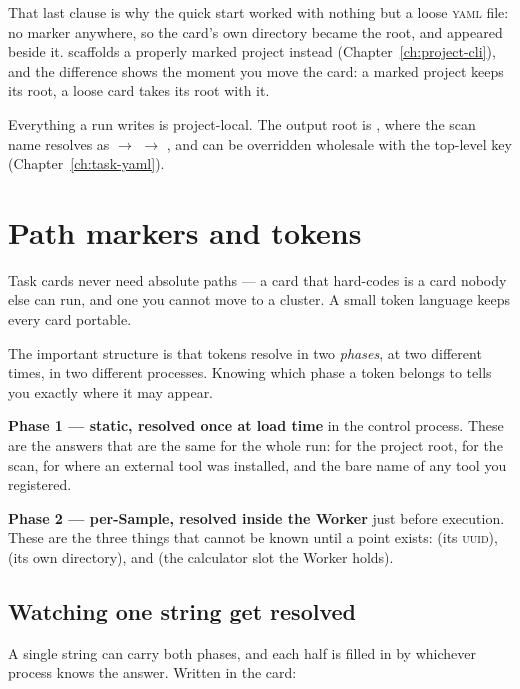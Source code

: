 That last clause is why the quick start worked with nothing but a loose \textsc{yaml}
file: no marker anywhere, so the card's own directory became the root, and 
appeared beside it.  scaffolds a properly marked project
instead (Chapter~\ref{ch:project-cli}), and the difference shows the moment you move the
card: a marked project keeps its root, a loose card takes its root with it.

Everything a run writes is project-local. The output root is
, where the scan name resolves as
 $\rightarrow$  $\rightarrow$ , and
can be overridden wholesale with the top-level key 
(Chapter~\ref{ch:task-yaml}).

\section{Path markers and tokens}
\label{sec:tokens}

Task cards never need absolute paths --- a card that hard-codes  is a
card nobody else can run, and one you cannot move to a cluster. A small token language
keeps every card portable.

The important structure is that tokens resolve in two \emph{phases}, at two different
times, in two different processes. Knowing which phase a token belongs to tells you
exactly where it may appear.

\textbf{Phase 1 --- static, resolved once at load time} in the control process. These are
the answers that are the same for the whole run:  for the project root,
 for the scan,  for where an external
tool was installed, and the bare name of any tool you registered.

\textbf{Phase 2 --- per-Sample, resolved inside the Worker} just before execution. These
are the three things that cannot be known until a point exists:  (its
\textsc{uuid}),  (its own directory), and  (the calculator
slot the Worker holds).

\subsection{Watching one string get resolved}

A single string can carry both phases, and each half is filled in by whichever process
knows the answer. Written in the card:

